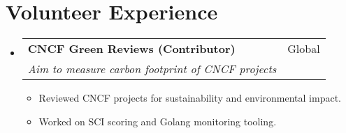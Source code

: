 \documentclass[a4paper,20pt]{article}
\makeatletter
\newcommand{\resumeSubheading}[4]{
  \vspace{-1pt}\item
    \begin{tabular*}{0.97\textwidth}{l@{\extracolsep{\fill}}r}
      \textbf{#1} & #2 \\
      \textit{#3} & \textit{#4} \\
    \end{tabular*}\vspace{-5pt}
}
\newcommand{\resumeSubHeadingListStart}{\begin{itemize}[leftmargin=*]}
\newcommand{\resumeSubHeadingListEnd}{\end{itemize}}
\makeatother
\begin{document}
\vspace{-5pt}
\section{Volunteer Experience}
  \resumeSubHeadingListStart
    \resumeSubheading
    {CNCF Green Reviews (Contributor)}{Global}
    {Aim to measure carbon footprint of CNCF projects}{}
    \begin{itemize}[leftmargin=*]
        \item Reviewed CNCF projects for sustainability and environmental impact.
        \item Worked on SCI scoring and Golang monitoring tooling.
    \end{itemize}

\resumeSubHeadingListEnd
\end{document}

